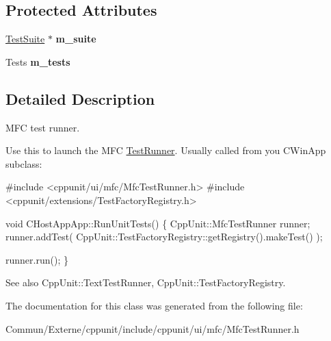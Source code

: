 \subsection*{Protected Attributes}
\begin{DoxyCompactItemize}
\item 
\hyperlink{class_test_suite}{Test\+Suite} $\ast$ {\bfseries m\+\_\+suite}\hypertarget{class_mfc_test_runner_a7700f0b285e70f42f3e84b56be890658}{}\label{class_mfc_test_runner_a7700f0b285e70f42f3e84b56be890658}

\item 
Tests {\bfseries m\+\_\+tests}\hypertarget{class_mfc_test_runner_a041d453efb2f9e262676f1d68f1c22af}{}\label{class_mfc_test_runner_a041d453efb2f9e262676f1d68f1c22af}

\end{DoxyCompactItemize}


\subsection{Detailed Description}
M\+FC test runner.

Use this to launch the M\+FC \hyperlink{class_test_runner}{Test\+Runner}. Usually called from you C\+Win\+App subclass\+: 


\begin{DoxyCode}
\textcolor{preprocessor}{#include <cppunit/ui/mfc/MfcTestRunner.h>}
\textcolor{preprocessor}{#include <cppunit/extensions/TestFactoryRegistry.h>}

\textcolor{keywordtype}{void} 
CHostAppApp::RunUnitTests()
\{
  CppUnit::MfcTestRunner runner;
  runner.addTest( CppUnit::TestFactoryRegistry::getRegistry().makeTest() );

  runner.run();    
\}
\end{DoxyCode}
 \begin{DoxySeeAlso}{See also}
Cpp\+Unit\+::\+Text\+Test\+Runner, Cpp\+Unit\+::\+Test\+Factory\+Registry. 
\end{DoxySeeAlso}


The documentation for this class was generated from the following file\+:\begin{DoxyCompactItemize}
\item 
Commun/\+Externe/cppunit/include/cppunit/ui/mfc/Mfc\+Test\+Runner.\+h\end{DoxyCompactItemize}

